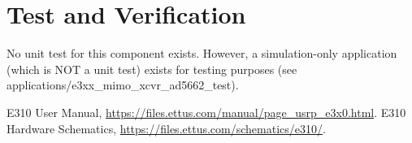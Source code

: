 \documentclass{article}
\begin{document}
\section*{Test and Verification}
No unit test for this component exists. However, a simulation-only application (which is NOT a unit test) exists for testing purposes (see applications/e3xx\_mimo\_xcvr\_ad5662\_test).

\begin{thebibliography}{2}
  E310 User Manual,
  \url{https://files.ettus.com/manual/page\_usrp\_e3x0.html}.
  E310 Hardware Schematics,
  \url{https://files.ettus.com/schematics/e310/}.
\end{thebibliography}
\end{document}
